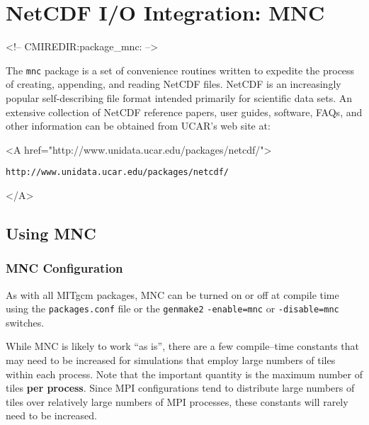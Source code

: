 
\section{NetCDF I/O Integration: MNC}
\label{sec:pkg:mnc}
\begin{rawhtml}
<!-- CMIREDIR:package_mnc: -->
\end{rawhtml}

The \texttt{mnc} package is a set of convenience routines written to
expedite the process of creating, appending, and reading NetCDF files.
NetCDF is an increasingly popular self-describing file format
\cite{rew:97} intended primarily for scientific data sets.  An
extensive collection of NetCDF reference papers, user guides,
software, FAQs, and other information can be obtained from UCAR's web
site at:
\begin{rawhtml} <A href="http://www.unidata.ucar.edu/packages/netcdf/"> \end{rawhtml}
\begin{verbatim}
http://www.unidata.ucar.edu/packages/netcdf/
\end{verbatim}
\begin{rawhtml} </A> \end{rawhtml}


\subsection{Using MNC}

\subsubsection{MNC Configuration}

As with all MITgcm packages, MNC can be turned on or off at compile time
using the \texttt{packages.conf} file or the \texttt{genmake2}
\texttt{-enable=mnc} or \texttt{-disable=mnc} switches.

While MNC is likely to work ``as is'', there are a few compile--time
constants that may need to be increased for simulations that employ
large numbers of tiles within each process.  Note that the important
quantity is the maximum number of tiles \textbf{per process}.  Since
MPI configurations tend to distribute large numbers of tiles over
relatively large numbers of MPI processes, these constants will rarely
need to be increased.

